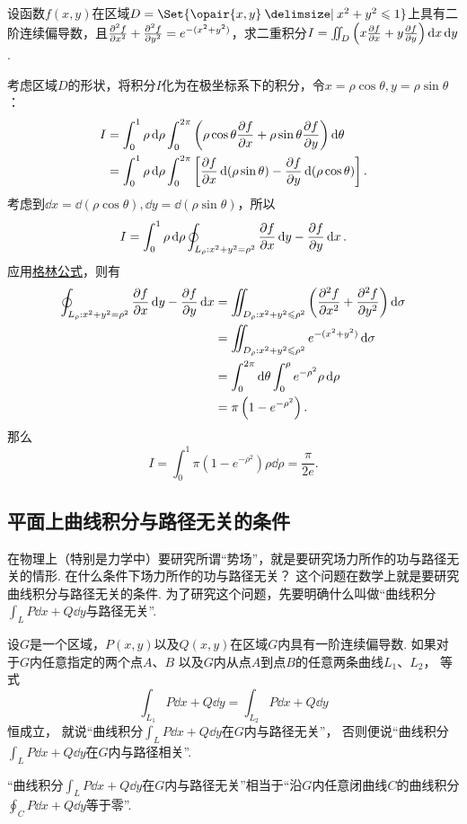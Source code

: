 \begin{example}
设函数\(f(x,y)\)在区域\(D=\Set{\opair{x,y} \given x^2+y^2\leqslant1}\)上具有二阶连续偏导数，且\(\pdv[2]{f}{x}+\pdv[2]{f}{y}=e^{-(x^2+y^2)}\)，求二重积分\(I=\iint_D\left(x\pdv{f}{x}+y\pdv{f}{y}\right)\dd{x}\dd{y}\).
\begin{solution}
考虑区域\(D\)的形状，将积分\(I\)化为在极坐标系下的积分，令\(x=\rho\cos\theta, y=\rho\sin\theta\)：\begin{align*}
I &= \int_0^1 \rho\dd{\rho} \int_0^{2\pi} \left(\rho\cos\theta\pdv{f}{x}+\rho\sin\theta\pdv{f}{y}\right) \dd{\theta} \\
&= \int_0^1 \rho\dd{\rho} \int_0^{2\pi} \left[\pdv{f}{x}\dd(\rho\sin\theta)-\pdv{f}{y}\dd(\rho\cos\theta)\right].
\end{align*}
考虑到\(\dd{x}=\dd(\rho\cos\theta), \dd{y}=\dd(\rho\sin\theta)\)，所以\[
I = \int_0^1 \rho\dd{\rho} \oint_{L_{\rho}: x^2+y^2=\rho^2} \pdv{f}{x}\dd{y}-\pdv{f}{y}\dd{x}.
\]应用\hyperref[equation:线积分与面积分.格林公式]{格林公式}，则有\begin{align*}
\oint_{L_{\rho}: x^2+y^2=\rho^2} \pdv{f}{x}\dd{y}-\pdv{f}{y}\dd{x}
&= \iint_{D_{\rho}: x^2+y^2\leqslant\rho^2} \left(\pdv[2]{f}{x}+\pdv[2]{f}{y}\right) \dd{\sigma} \\
&= \iint_{D_{\rho}: x^2+y^2\leqslant\rho^2} e^{-(x^2+y^2)} \dd{\sigma} \\
&= \int_0^{2\pi} \dd{\theta} \int_0^{\rho} e^{-\rho^2} \rho\dd{\rho} \\
&= \pi \left(1-e^{-\rho^2}\right).
\end{align*}
那么\[
I = \int_0^1 \pi \left(1-e^{-\rho^2}\right) \rho\dd{\rho}
=  \frac{\pi}{2e}.
\]
\end{solution}
\end{example}

\subsection{平面上曲线积分与路径无关的条件}
在物理上（特别是力学中）要研究所谓“势场”，就是要研究场力所作的功与路径无关的情形.
在什么条件下场力所作的功与路径无关？
这个问题在数学上就是要研究曲线积分与路径无关的条件.
为了研究这个问题，先要明确什么叫做“曲线积分\(\int_L P\dd{x}+Q\dd{y}\)与路径无关”.
\begin{definition}
设\(G\)是一个区域，\(P(x,y)\)以及\(Q(x,y)\)在区域\(G\)内具有一阶连续偏导数.
如果对于\(G\)内任意指定的两个点\(A\)、\(B\)
以及\(G\)内从点\(A\)到点\(B\)的任意两条曲线\(L_1\)、\(L_2\)，%
等式\[
\int_{L_1}{P\dd{x}+Q\dd{y}}
=\int_{L_2}{P\dd{x}+Q\dd{y}}
\]恒成立，%
就说“曲线积分\(\int_L P\dd{x}+Q\dd{y}\)在\(G\)内与路径无关”，
否则便说“曲线积分\(\int_L P\dd{x}+Q\dd{y}\)在\(G\)内与路径相关”.
\end{definition}
“曲线积分\(\int_L P\dd{x}+Q\dd{y}\)在\(G\)内与路径无关”相当于“沿\(G\)内任意闭曲线\(C\)的曲线积分\(\oint_C P\dd{x}+Q\dd{y}\)等于零”.

